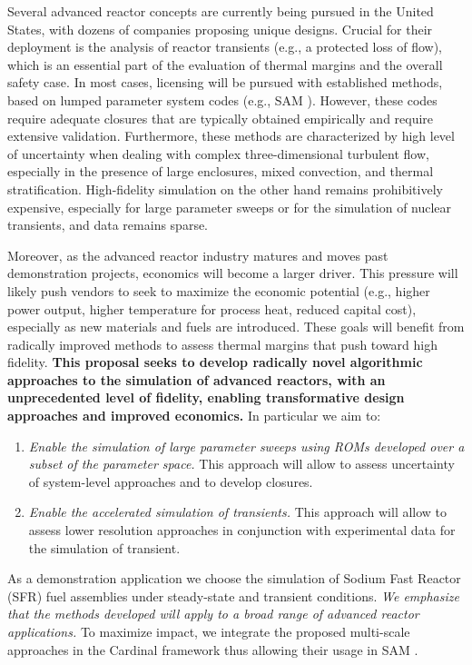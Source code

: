 Several  advanced reactor concepts are currently being pursued in the United
States, with dozens of companies proposing unique designs. Crucial for their
deployment is the analysis of  reactor transients (e.g., a protected loss of
flow), which is an essential part of the evaluation of thermal margins and the overall
safety case.  In most cases, licensing will be pursued with established
methods, based on lumped parameter system codes (e.g., SAM \cite{hu2021}).
However, these codes require adequate closures that are typically obtained
empirically and require extensive validation. Furthermore, these methods are
characterized by high level of uncertainty when dealing with complex
three-dimensional turbulent flow, especially in the presence of large
enclosures, mixed convection, and thermal stratification. High-fidelity
simulation on the other hand remains prohibitively expensive, especially for
large parameter sweeps or for the simulation of nuclear transients, and data
remains sparse.

Moreover, as the advanced reactor industry matures and moves past demonstration
projects, economics will become a larger driver. This pressure will likely push
vendors to seek to maximize the economic potential (e.g., higher power output,
higher temperature for process heat, reduced capital cost), especially as new
materials and fuels are introduced. These goals will benefit from radically
improved methods to assess thermal margins that push toward high fidelity.
\textbf{This proposal seeks to develop radically novel algorithmic approaches
to the simulation of advanced reactors, with an unprecedented level of
fidelity, enabling transformative design approaches and improved economics.}
In particular we aim to:
\begin{enumerate}
%
   \item \textit{Enable the simulation of large parameter sweeps using 
   ROMs developed over a subset of the parameter space.} This approach
   will allow to assess uncertainty of system-level approaches and to develop
   closures.
%
   \item \textit{Enable the accelerated simulation of transients.}
   This approach will allow to assess lower resolution approaches in conjunction
   with experimental data for the simulation of transient.
\\[-5ex]
\end{enumerate}
As a demonstration application we choose the simulation of Sodium Fast Reactor
(SFR) fuel assemblies under steady-state and transient conditions. \textit{We
emphasize that the methods developed will apply to a broad range of advanced
reactor applications.} To maximize impact, we integrate the proposed multi-scale approaches in the Cardinal \cite{cardinal} framework thus allowing their usage in SAM \cite{hu2021}.

